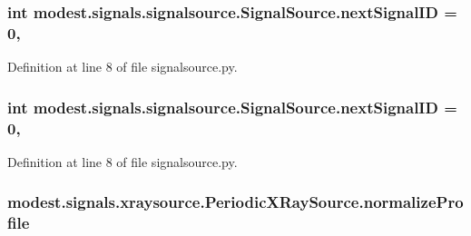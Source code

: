 \subsubsection[{\texorpdfstring{next\+Signal\+ID}{nextSignalID}}]{\setlength{\rightskip}{0pt plus 5cm}int modest.\+signals.\+signalsource.\+Signal\+Source.\+next\+Signal\+ID = 0\hspace{0.3cm}{\ttfamily [static]}, {\ttfamily [inherited]}}\hypertarget{classmodest_1_1signals_1_1signalsource_1_1SignalSource_a453eafb550b551adbec0903deb63dfce}{}\label{classmodest_1_1signals_1_1signalsource_1_1SignalSource_a453eafb550b551adbec0903deb63dfce}


Definition at line 8 of file signalsource.\+py.

\subsubsection[{\texorpdfstring{next\+Signal\+ID}{nextSignalID}}]{\setlength{\rightskip}{0pt plus 5cm}int modest.\+signals.\+signalsource.\+Signal\+Source.\+next\+Signal\+ID = 0\hspace{0.3cm}{\ttfamily [static]}, {\ttfamily [inherited]}}\hypertarget{classmodest_1_1signals_1_1signalsource_1_1SignalSource_a453eafb550b551adbec0903deb63dfce}{}\label{classmodest_1_1signals_1_1signalsource_1_1SignalSource_a453eafb550b551adbec0903deb63dfce}


Definition at line 8 of file signalsource.\+py.

\subsubsection[{\texorpdfstring{normalize\+Profile}{normalizeProfile}}]{\setlength{\rightskip}{0pt plus 5cm}modest.\+signals.\+xraysource.\+Periodic\+X\+Ray\+Source.\+normalize\+Profile}\hypertarget{classmodest_1_1signals_1_1xraysource_1_1PeriodicXRaySource_ac7490bebcc1d508b7813ea274cc36702}{}\label{classmodest_1_1signals_1_1xraysource_1_1PeriodicXRaySource_ac7490bebcc1d508b7813ea274cc36702}


